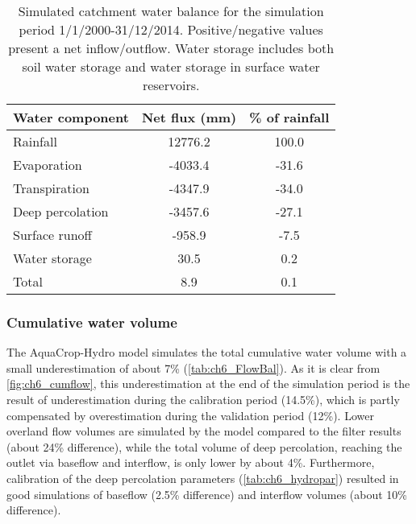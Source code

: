 \begin{table}[htbp]
  \centering
  	\caption{Simulated catchment water balance for the simulation period 1/1/2000-31/12/2014. Positive/negative values present a net inflow/outflow. Water storage includes both soil water storage and water storage in surface water reservoirs.}
\begin{tabular}{lcc}
\toprule
\textbf{Water component} & \textbf{Net flux (mm)} & \textbf{\% of rainfall} \\
\midrule
Rainfall & 12776.2 & 100.0 \\
Evaporation & -4033.4 & -31.6 \\
Transpiration  & -4347.9 & -34.0 \\
Deep percolation  & -3457.6 & -27.1 \\
Surface runoff  & -958.9 & -7.5 \\
Water storage  & 30.5  & 0.2 \\
Total & 8.9   & 0.1 \\
\bottomrule
\end{tabular}%
  \label{tab:ch6_Wabal}%
  \end{table}


\subsubsection{Cumulative water volume}
The AquaCrop-Hydro model simulates the total cumulative water volume with a small underestimation of about 7\% (\autoref{tab:ch6_FlowBal}). As it is clear from \autoref{fig:ch6_cumflow}, this underestimation at the end of the simulation period is the result of underestimation during the calibration period (14.5\%), which is partly compensated by overestimation during the validation period (12\%). Lower overland flow volumes are simulated by the model compared to the filter results (about 24\% difference), while the total volume of deep percolation, reaching the outlet via baseflow and interflow, is only lower by about 4\%. Furthermore, calibration of the deep percolation parameters (\autoref{tab:ch6_hydropar}) resulted in good simulations of baseflow (2.5\% difference) and interflow volumes (about 10\% difference). 

